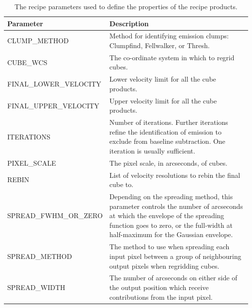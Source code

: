 \documentclass[11pt,oneside,chapters]{starlink}
\begin{document}
\begin{table}[h!]
\begin{small}
\begin{tabular}{|p{6.8cm}|p{8.6cm}|}
\hline
\textbf{Parameter} & \textbf{Description} \\
\hline
CLUMP\_METHOD & Method for identifying emission clumps: Clumpfind,
                Fellwalker, or Thresh.\\
\hline
CUBE\_WCS & The co-ordinate system in which to regrid cubes.\\
\hline
FINAL\_LOWER\_VELOCITY & Lower velocity limit for all the cube products.\\
FINAL\_UPPER\_VELOCITY & Upper velocity limit for all the cube products.\\
\hline
ITERATIONS & Number of iterations. Further iterations refine the
             identification of emission to exclude from baseline subtraction.
             One iteration is usually sufficient.\\
\hline
PIXEL\_SCALE & The pixel scale, in arcseconds, of cubes.\\
\hline
REBIN & List of velocity resolutions to rebin the final cube to.\\
\hline
SPREAD\_FWHM\_OR\_ZERO & Depending on the spreading method, this parameter controls the
                         number of arcseconds at which the envelope of the spreading
                         function goes to zero, or the full-width at half-maximum
                         for the Gaussian envelope. \\
SPREAD\_METHOD & The method to use when spreading each input pixel between a group of
                 neighbouring output pixels when regridding cubes.\\
SPREAD\_WIDTH & The number of arcseconds on either side of the output position which
                receive contributions from the input pixel.\\
\hline
\end{tabular}
\end{small}
\caption{\label{tab:makecube_params}
  The recipe parameters used to define the properties of the recipe products.}
\end{table}
\end{document}
